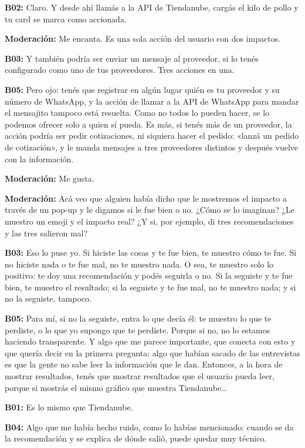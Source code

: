 \noindent\textbf{B02:} Claro. Y desde ahí llamás a la API de Tiendanube, cargás el kilo de pollo y tu card se marca como accionada.

\noindent\textbf{Moderación:} Me encanta. Es una sola acción del usuario con dos impactos.

\noindent\textbf{B03:} Y también podría ser enviar un mensaje al proveedor, si lo tenés configurado como uno de tus proveedores. Tres acciones en una.

\noindent\textbf{B05:} Pero ojo: tenés que registrar en algún lugar quién es tu proveedor y su número de WhatsApp, y la acción de llamar a la API de WhatsApp para mandar el mensajito tampoco está resuelta. Como no todos lo pueden hacer, se lo podemos ofrecer solo a quien sí pueda. Es más, si tenés más de un proveedor, la acción podría ser pedir cotizaciones, ni siquiera hacer el pedido: «lanzá un pedido de cotización», y le manda mensajes a tres proveedores distintos y después vuelve con la información.

\noindent\textbf{Moderación:} Me gusta.

\noindent\textbf{Moderación:} Acá veo que alguien había dicho que le mostremos el impacto a través de un pop-up y le digamos si le fue bien o no. ¿Cómo se lo imaginan? ¿Le muestro un emoji y el impacto real? ¿Y si, por ejemplo, di tres recomendaciones y las tres salieron mal?

\noindent\textbf{B03:} Eso lo puse yo. Si hiciste las cosas y te fue bien, te muestro cómo te fue. Si no hiciste nada o te fue mal, no te muestro nada. O sea, te muestro solo lo positivo: te doy una recomendación y podés seguirla o no. Si la seguiste y te fue bien, te muestro el resultado; si la seguiste y te fue mal, no te muestro nada; y si no la seguiste, tampoco.

\noindent\textbf{B05:} Para mí, si no la seguiste, entra lo que decía él: te muestro lo que te perdiste, o lo que yo supongo que te perdiste. Porque si no, no lo estamos haciendo transparente. Y algo que me parece importante, que conecta con esto y que quería decir en la primera pregunta: algo que habían sacado de las entrevistas es que la gente no sabe leer la información que le dan. Entonces, a la hora de mostrar resultados, tenés que mostrar resultados que el usuario pueda leer, porque si mostrás el mismo gráfico que muestra Tiendanube…

\noindent\textbf{B01:} Es lo mismo que Tiendanube.

\noindent\textbf{B04:} Algo que me había hecho ruido, como lo habías mencionado: cuando se da la recomendación y se explica de dónde salió, puede quedar muy técnico.

